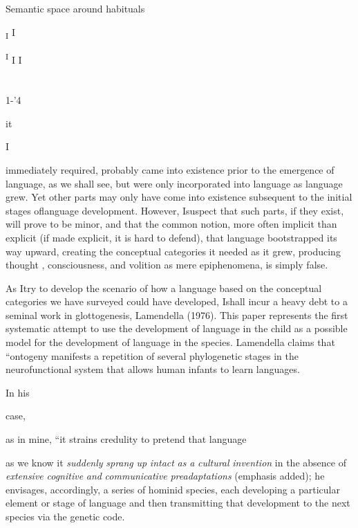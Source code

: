 Semantic space around habituals


\textsubscript{I} I

\textsuperscript{I }I I 

\section{}
1-'4

it

I


immediately required, probably came into existence prior to the emergence of language, as we shall see, but were only incorporated into language as language grew. Yet other parts may only have come into existence subsequent to the initial stages oflanguage development. However, Isuspect that such parts, if they exist, will prove to be minor, and that the common notion, more often implicit than explicit (if made explicit, it is hard to defend), that language bootstrapped its way upward, creating the conceptual categories it needed as it grew, pro\-ducing thought , consciousness, and volition as mere epiphenomena, is simply false.

As Itry to develop the scenario of how a language based on the conceptual categories we have surveyed could have developed, Ishall incur a heavy debt to a seminal work in glottogenesis, Lamen\-della (1976). This paper represents the first systematic attempt to use the development of language in the child as a possible model for the development of language in the species. Lamendella claims that ``on\-togeny manifests a repetition of several phylogenetic stages in the neurofunctional system that allows human infants to learn languages.{\textquotedbl}

In his

case,

as in mine, ``it strains credulity to pretend that language

as we know it \textit{suddenly} \textit{sprang} \textit{up} \textit{intact} \textit{as} \textit{a} \textit{cultural} \textit{invention} in the absence of \textit{extensive} \textit{cognitive} \textit{and} \textit{communicative} \textit{preadaptations{\textquotedbl}} (emphasis added); he envisages, accordingly, a series of hominid species, each developing a particular element or stage of language and then transmitting that development to the next species via the genetic code. 

